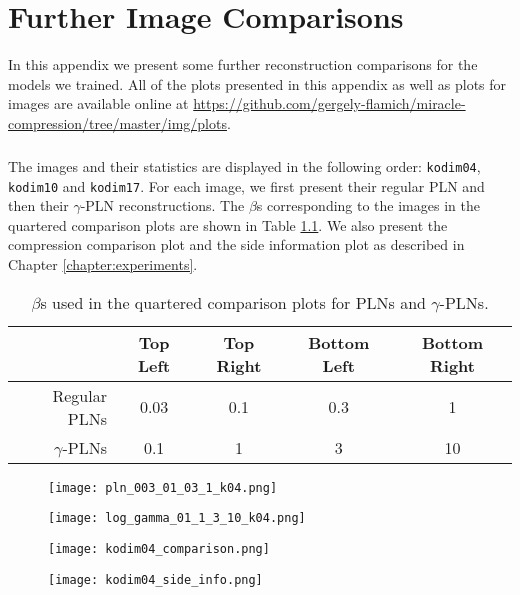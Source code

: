 
\chapter{Further Image Comparisons}
\label{chapter:appendix_b}

\graphicspath{{../img/plots/kodak_comparison/}{../img/plots/kodak_coding_time/}{../img/plots/kodak_side_info/}{../img/plots/reconstructions/}}


\par In this appendix we present some further reconstruction comparisons for the
models we trained. All of the plots presented in this appendix as well as plots
for images are available online at
\url{https://github.com/gergely-flamich/miracle-compression/tree/master/img/plots}. 

\paragraph{}
The images and their statistics are displayed in the following order:
\texttt{kodim04}, \texttt{kodim10} and \texttt{kodim17}.
For each image, we first present their regular PLN and then their $\gamma$-PLN
reconstructions.
The $\beta$s corresponding to the images in the quartered comparison plots are
shown in Table \ref{tab:beta_layout}.
We also present the compression comparison plot and the side information plot
as described in Chapter \ref{chapter:experiments}.
\begin{table}[H]
  \centering
  \begin{tabular}{|r|c|c|c|c|}
    \hline
    & \textbf{Top Left} & \textbf{Top Right} & \textbf{Bottom Left} & \textbf{Bottom Right} \\
    \hline\hline
    Regular PLNs & 0.03 & 0.1 & 0.3 & 1 \\
    \hline
    $\gamma$-PLNs & 0.1 & 1 & 3 & 10 \\
    \hline
  \end{tabular}
  \caption{$\beta$s used in the quartered comparison plots for PLNs and $\gamma$-PLNs.}
  \label{tab:beta_layout}
\end{table}


\begin{figure}
  \centering
  \texttt{[image: pln\_003\_01\_03\_1\_k04.png]}
\end{figure}
\begin{figure}
  \centering
  \texttt{[image: log\_gamma\_01\_1\_3\_10\_k04.png]}
\end{figure}
\begin{figure}
  \centering
  \texttt{[image: kodim04\_comparison.png]}
\end{figure}
\begin{figure}
  \centering
  \texttt{[image: kodim04\_side\_info.png]}
\end{figure}

